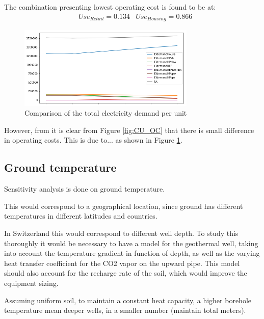 \documentclass{article}
\begin{document}
The combination presenting lowest operating cost is found to be at:
\begin{align}
	& Use_{Retail} = 0.134
	& Use_{Housing} = 0.866
\end{align}

\begin{figure}[htp]
	\centering
	\includegraphics[width=0.75\textwidth]{CU_el.png}
	\caption{Comparison of the total electricity demand per unit}
	\label{fig:CU_el}
\end{figure}

However, from it is clear from Figure \ref{fig:CU_OC} that there is small difference in operating costs. This is due to... as shown in Figure \ref{fig:CU_el}.


\subsection{Ground temperature}
Sensitivity analysis is done on ground temperature.

This would correspond to a geographical location, since ground has different temperatures in different latitudes and countries.

In Switzerland this would correspond to different well depth. To study this thoroughly it would be necessary to have a model for the geothermal well, taking into account the temperature gradient in function of depth, as well as the varying heat transfer coefficient for the CO2 vapor on the upward pipe. This model should also account for the recharge rate of the soil, which would improve the equipment sizing.

Assuming uniform soil, to maintain a constant heat capacity, a higher borehole temperature mean deeper wells, in a smaller number (maintain total meters).
\end{document}
